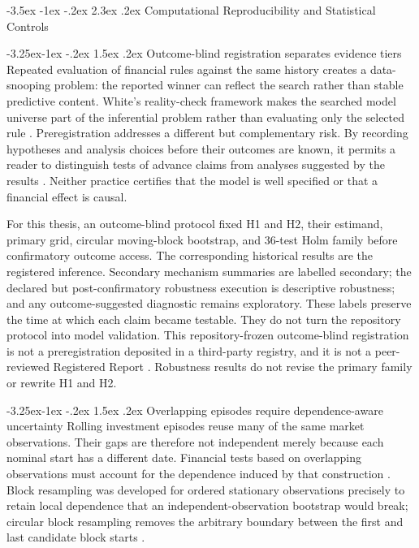 \documentclass[12pt,a4paper,oneside]{report}
\makeatletter
\renewcommand\section{\@startsection{section}{1}{\z@}%
  {-3.5ex \@plus -1ex \@minus -.2ex}%
  {2.3ex \@plus .2ex}%
  {\normalfont\fontsize{14}{17}\selectfont\bfseries}}
\renewcommand\subsection{\@startsection{subsection}{2}{\z@}%
  {-3.25ex\@plus -1ex \@minus -.2ex}%
  {1.5ex \@plus .2ex}%
  {\normalfont\fontsize{12}{15}\selectfont\bfseries}}
\makeatother
\begin{document}
\section{Computational Reproducibility and Statistical Controls}

\subsection{Outcome-blind registration separates evidence tiers}
\label{sec:lit-method-registration}
Repeated evaluation of financial rules against the same history creates a
data-snooping problem: the reported winner can reflect the search rather than
stable predictive content. White's reality-check framework makes the searched
model universe part of the inferential problem rather than evaluating only the
selected rule \citep{white2000datasnooping}. Preregistration addresses a
different but complementary risk. By recording hypotheses and analysis choices
before their outcomes are known, it permits a reader to distinguish tests of
advance claims from analyses suggested by the results
\citep{nosek2018preregistration}. Neither practice certifies that the model is
well specified or that a financial effect is causal.

For this thesis, an outcome-blind protocol fixed H1 and H2, their estimand,
primary grid, circular moving-block bootstrap, and 36-test Holm family before
confirmatory outcome access. The corresponding historical results are the
registered inference. Secondary mechanism summaries are labelled secondary;
the declared but post-confirmatory robustness execution is descriptive
robustness; and any outcome-suggested diagnostic remains exploratory. These
labels preserve the time at which each claim became testable. They do not turn
the repository protocol into model validation. This repository-frozen
outcome-blind registration is not a preregistration deposited in a third-party
registry, and it is not a peer-reviewed Registered Report
\citep{nosek2018preregistration}. Robustness results do not revise the primary
family or rewrite H1 and H2.

\subsection{Overlapping episodes require dependence-aware uncertainty}
\label{sec:lit-method-overlap-resampling}
Rolling investment episodes reuse many of the same market observations. Their
gaps are therefore not independent merely because each nominal start has a
different date. Financial tests based on overlapping observations must account
for the dependence induced by that construction
\citep{richardsonsmith1991overlap}. Block resampling was developed for ordered
stationary observations precisely to retain local dependence that an
independent-observation bootstrap would break; circular block resampling removes
the arbitrary boundary between the first and last candidate block starts
\citep{kunsch1989blockbootstrap,politisromano1992circular}.
\end{document}
